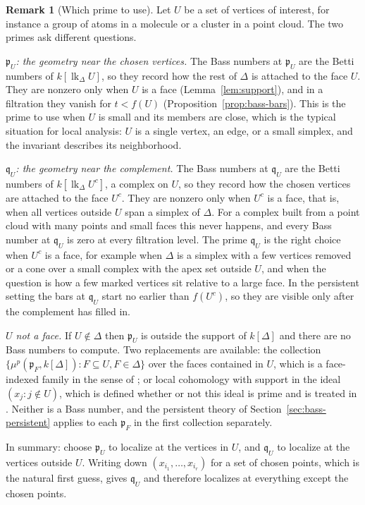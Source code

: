 \documentclass[11pt]{article}
\theoremstyle{plain}
\theoremstyle{definition}
\newtheorem{remark}[theorem]{Remark}
\newcommand{\kk}{k}
\newcommand{\pp}{\mathfrak{p}}
\newcommand{\link}{\operatorname{lk}}
\begin{document}
\begin{remark}[Which prime to use]\label{rem:which-prime}
Let $U$ be a set of vertices of interest, for instance a group of atoms in a molecule or a cluster in a point
cloud. The two primes ask different questions.

\emph{$\pp_U$: the geometry near the chosen vertices.} The Bass numbers at $\pp_U$ are the Betti numbers of
$\kk[\link_\Delta U]$, so they record how the rest of $\Delta$ is attached to the face $U$. They are nonzero only
when $U$ is a face (Lemma~\ref{lem:support}), and in a filtration they vanish for $t<f(U)$
(Proposition~\ref{prop:bass-bars}). This is the prime to use when $U$ is small and its members are close,
which is the typical situation for local analysis: $U$ is a single vertex, an edge, or a small simplex, and
the invariant describes its neighborhood.

\emph{$\mathfrak q_U$: the geometry near the complement.} The Bass numbers at $\mathfrak q_U$ are the Betti numbers of
$\kk[\link_\Delta U^c]$, a complex on $U$, so they record how the chosen vertices are attached to the face
$U^c$. They are nonzero only when $U^c$ is a face, that is, when all vertices outside $U$ span a simplex of
$\Delta$. For a complex built from a point cloud with many points and small faces this never happens, and
every Bass number at $\mathfrak q_U$ is zero at every filtration level. The prime $\mathfrak q_U$ is the right choice
when $U^c$ is a face, for example when $\Delta$ is a simplex with a few vertices removed or a cone over a small
complex with the apex set outside $U$, and when the question is how a few marked vertices sit relative to a
large face. In the persistent setting the bars at $\mathfrak q_U$ start no earlier than $f(U^c)$, so they are
visible only after the complement has filled in.

\emph{$U$ not a face.} If $U\notin\Delta$ then $\pp_U$ is outside the support of $\kk[\Delta]$ and there are no
Bass numbers to compute. Two replacements are available: the collection $\{\mu^p(\pp_F,\kk[\Delta]):F\subseteq U,
F\in\Delta\}$ over the faces contained in $U$, which is a face-indexed family in the sense of
\cite{HeSuwayyidWei}; or local cohomology with support in the ideal $(x_j:j\notin U)$, which is defined whether or
not this ideal is prime and is treated in \cite[\S7]{HeSuwayyidWei}. Neither is a Bass number, and the
persistent theory of Section~\ref{sec:bass-persistent} applies to each $\pp_F$ in the first collection separately.

In summary: choose $\pp_U$ to localize at the vertices in $U$, and $\mathfrak q_U$ to localize at the vertices
outside $U$. Writing down $(x_{i_1},\dots,x_{i_r})$ for a set of chosen points, which is the natural first
guess, gives $\mathfrak q_U$ and therefore localizes at everything except the chosen points.
\end{remark}
\end{document}

